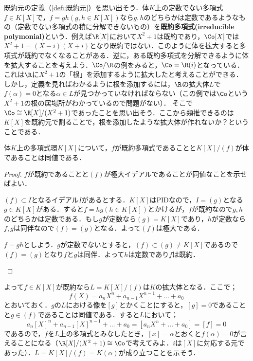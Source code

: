 既約元の定義（\ref{defi:既約元}）を思い出そう．体$K$上の定数でない多項式$f\in K[X]$で，$f=gh (g,h\in K[X])$なら$g,h$のどちらかは定数であるようなもの（定数でない多項式の積に分解できないもの）を\textbf{既約多項式(irreducible polymonial)}という．例えば$\R[X]$において$X^2+1$は既約であり，$\Co[X]$では$X^2+1=(X-i)(X+i)$となり既約ではない．このように体を拡大すると多項式が既約でなくなることがある．逆に，ある既約多項式を分解できるように体を拡大することを考えよう．$\Co/\R$の例をみると，$\Co=\R(i)$となっている．これは$\R$に$X^2+1$の「根」を添加するように拡大したと考えることができる．しかし，定義を見ればわかるように根を添加するには，$\R$の拡大体$L$で$f(\alpha)=0$となる$\alpha\in L$が見つかっていなければならない（この例では$\Co$という$X^2+1$の根の居場所がわかっているので問題がない）． そこで$\Co\cong\R[X]/(X^2+1)$であったことを思い出そう．ここから類推できるのは$K[X]$を既約元で割ることで，根を添加したような拡大体が作れないか？ということである．

\begin{prop}
	体$K$上の多項式環$K[X]$について，$f$が既約多項式であることと$K[X]/(f)$が体であることは同値である．
\end{prop}

\begin{proof}
	$f$が既約であることと$(f)$が極大イデアルであることが同値なことを示せばよい．
	
	\begin{eqv}
		\item $(f)\subset I$となるイデアル$I$があるとする．$K[X]$はPIDなので，$I=(g)$となる$g\in K[X]$がある．すると$f=hg (h\in K[X])$とかけるが，$f$が既約なので$g,h$のどちらかは定数である．もし$g$が定数なら$(g)=K[X]$であり，$h$が定数なら$f,g$は同伴なので$(f)=(g)$となる．よって$(f)$は極大である．
		\item $f=gh$としよう．$g$が定数でないとすると，$(f)\subset(g)\neq K[X]$であるので$(f)=(g)$となり$f$と$g$は同伴．よって$h$は定数であり$f$は既約．
	\end{eqv}
\end{proof}

よって$f\in K[X]$が既約なら$L=K[X]/(f)$は$K$の拡大体となる．ここで；
\[f(X)=a_nX^n+a_{n-1}X^{n-1}+\dots+a_0\]
とおいておく．$g$の$L$における像を$[g]$とかくことにすると，$[g]=0$であることと$g\in (f)$であることは同値である．すると$L$において；
\[a_n[X]^n+a_{n-1}[X]^{n-1}+\dots+a_0=[a_nX^n+\dots+a_0]=[f]=0\]
であるので，$f$を$L$上の多項式とみなしたとき，$[x]=\alpha$とおくと$f(\alpha)=0$が言えることになる（$\R[X]/(X^2+1)\cong\Co$で考えてみよ．$i$は$[X]$に対応する元であった）．$L=K[X]/(f)=K(\alpha)$が成り立つことを示そう．

